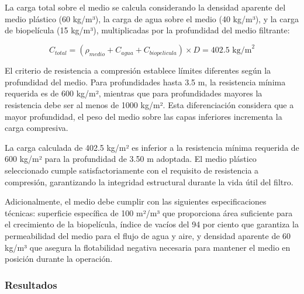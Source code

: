 \documentclass[12pt,a4paper]{article}
\begin{document}
La carga total sobre el medio se calcula considerando la densidad aparente del medio plástico (60 kg/m³), la carga de agua sobre el medio (40 kg/m³), y la carga de biopelícula (15 kg/m³), multiplicadas por la profundidad del medio filtrante:

\begin{equation}
C_{total} = (\rho_{medio} + C_{agua} + C_{biopelicula}) \times D = 402.5 \text{ kg/m}^2
\end{equation}

El criterio de resistencia a compresión establece límites diferentes según la profundidad del medio. Para profundidades hasta 3.5 m, la resistencia mínima requerida es de 600 kg/m², mientras que para profundidades mayores la resistencia debe ser al menos de 1000 kg/m². Esta diferenciación considera que a mayor profundidad, el peso del medio sobre las capas inferiores incrementa la carga compresiva.

La carga calculada de 402.5 kg/m² es inferior a la resistencia mínima requerida de 600 kg/m² para la profundidad de 3.50 m adoptada. El medio plástico seleccionado cumple satisfactoriamente con el requisito de resistencia a compresión, garantizando la integridad estructural durante la vida útil del filtro.

Adicionalmente, el medio debe cumplir con las siguientes especificaciones técnicas: superficie específica de 100 m²/m³ que proporciona área suficiente para el crecimiento de la biopelícula, índice de vacíos del 94 por ciento que garantiza la permeabilidad del medio para el flujo de agua y aire, y densidad aparente de 60 kg/m³ que asegura la flotabilidad negativa necesaria para mantener el medio en posición durante la operación.

\subsubsection{Resultados}
\end{document}
